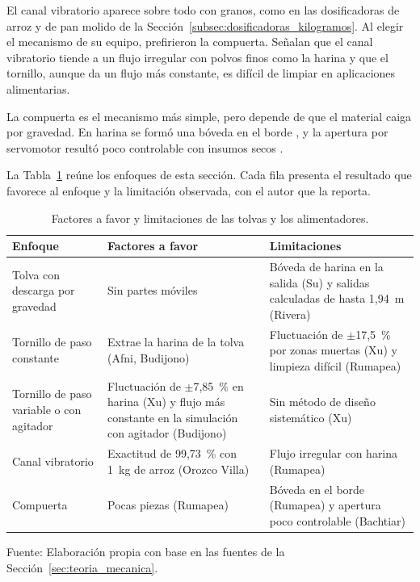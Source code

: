 El canal vibratorio aparece sobre todo con granos, como en las dosificadoras
de arroz y de pan molido de la Sección~\ref{subsec:dosificadoras_kilogramos}.
Al elegir el mecanismo de su equipo, \textcite{rumapea2026flour} prefirieron
la compuerta. Señalan que el canal vibratorio tiende a un flujo irregular con
polvos finos como la harina y que el tornillo, aunque da un flujo más
constante, es difícil de limpiar en aplicaciones alimentarias.

La compuerta es el mecanismo más simple, pero depende de que el material caiga
por gravedad. En harina se formó una bóveda en el borde
\parencite{rumapea2026flour}, y la apertura por servomotor resultó poco
controlable con insumos secos \parencite{bachtiar2026brownies}.

La Tabla~\ref{tab:mecanica_enfoques} reúne los enfoques de esta sección. Cada
fila presenta el resultado que favorece al enfoque y la limitación observada,
con el autor que la reporta.

\begin{table}[H]
    \centering
    \caption{Factores a favor y limitaciones de las tolvas y los alimentadores.}
    \label{tab:mecanica_enfoques}
    \footnotesize
    \setlength{\tabcolsep}{3pt}
    \renewcommand{\arraystretch}{1.25}

    \begin{tabularx}{\textwidth}{
        >{\raggedright\arraybackslash}p{}
        >{\raggedright\arraybackslash}X
        >{\raggedright\arraybackslash}X}
        \toprule[1pt]
        \textbf{Enfoque} & \textbf{Factores a favor} & \textbf{Limitaciones} \\
        \midrule[1pt]
        Tolva con descarga por gravedad & Sin partes móviles & Bóveda de harina
        en la salida (Su) y salidas calculadas de hasta 1,94~m (Rivera) \\
        Tornillo de paso constante & Extrae la harina de la tolva (Afni,
        Budijono) & Fluctuación de $\pm$17,5~\% por zonas muertas (Xu) y limpieza
        difícil (Rumapea) \\
        Tornillo de paso variable o con agitador & Fluctuación de $\pm$7,85~\%
        en harina (Xu) y flujo más constante en la simulación con agitador
        (Budijono) & Sin método de diseño sistemático (Xu) \\
        Canal vibratorio & Exactitud de 99,73~\% con 1~kg de arroz (Orozco
        Villa) & Flujo irregular con harina (Rumapea) \\
        Compuerta & Pocas piezas (Rumapea) & Bóveda en el borde (Rumapea) y
        apertura poco controlable (Bachtiar) \\
        \bottomrule[1pt]
    \end{tabularx}

    \vspace{2pt}
    {\footnotesize Fuente: Elaboración propia con base en las fuentes de la
    Sección~\ref{sec:teoria_mecanica}.}
\end{table}

